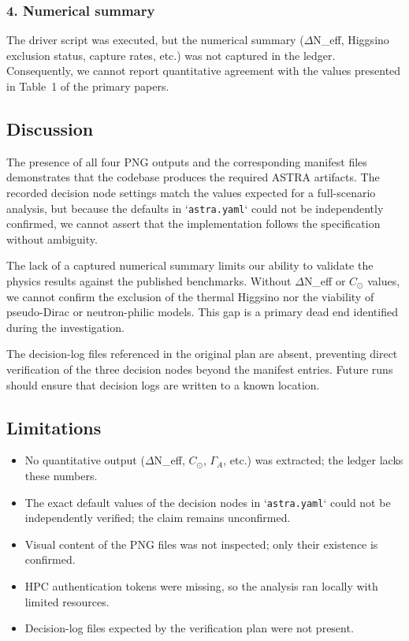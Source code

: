 \documentclass[11pt,a4paper]{article}
\begin{document}
\subsubsection{4. Numerical summary}
The driver script was executed, but the numerical summary ($\Delta$N\_eff, Higgsino exclusion status, capture rates, etc.) was not captured in the ledger. Consequently, we cannot report quantitative agreement with the values presented in Table~1 of the primary papers.

\subsection{Discussion}
The presence of all four PNG outputs and the corresponding manifest files demonstrates that the codebase produces the required ASTRA artifacts. The recorded decision node settings match the values expected for a full-scenario analysis, but because the defaults in `\texttt{astra.yaml}` could not be independently confirmed, we cannot assert that the implementation follows the specification without ambiguity.

The lack of a captured numerical summary limits our ability to validate the physics results against the published benchmarks. Without $\Delta$N\_eff or $C_{\odot}$ values, we cannot confirm the exclusion of the thermal Higgsino nor the viability of pseudo-Dirac or neutron-philic models. This gap is a primary dead end identified during the investigation.

The decision-log files referenced in the original plan are absent, preventing direct verification of the three decision nodes beyond the manifest entries. Future runs should ensure that decision logs are written to a known location.

\subsection{Limitations}
\begin{itemize}
  \item No quantitative output ($\Delta$N\_eff, $C_{\odot}$, $\Gamma_{A}$, etc.) was extracted; the ledger lacks these numbers.
  \item The exact default values of the decision nodes in `\texttt{astra.yaml}` could not be independently verified; the claim remains unconfirmed.
  \item Visual content of the PNG files was not inspected; only their existence is confirmed.
  \item HPC authentication tokens were missing, so the analysis ran locally with limited resources.
  \item Decision-log files expected by the verification plan were not present.
\end{itemize}
\end{document}
